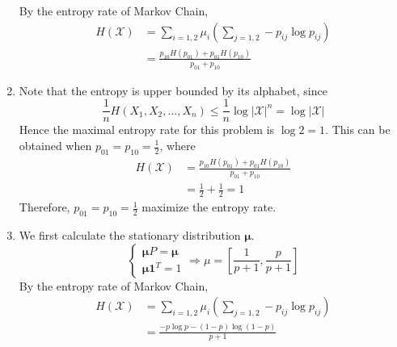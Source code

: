 \begin{exercise}
\begin{solution}
\begin{enumerate}
{\begin{equation}
      \end{equation}
      By the entropy rate of Markov Chain,
      \begin{equation}
        \begin{aligned}
          H(\mathcal{X}) &= \sum_{i=1,2} \mu_i \left(\sum_{j=1,2} - p_{ij} \log {p_{ij}}\right) \\
          &= \frac{p_{10}H(p_{01})+p_{01}H(p_{10})}{p_{01}+p_{10}}
        \end{aligned}
      \end{equation}
    }
    \item {
      Note that the entropy is upper bounded by its alphabet, since
      \begin{equation}
        \frac{1}{n} H\left(X_{1}, X_{2}, \ldots, X_{n}\right) \le \frac{1}{n} \log |\mathcal{X}|^n = \log |\mathcal{X}|
      \end{equation}
      Hence the maximal entropy rate for this problem is $\log 2 = 1$. This can be obtained when $p_{01} = p_{10} = \frac{1}{2}$, where
      \begin{equation}
        \begin{aligned}
          H(\mathcal{X}) &= \frac{p_{10}H(p_{01})+p_{01}H(p_{10})}{p_{01}+p_{10}} \\
          &= \frac{1}{2} + \frac{1}{2}  = 1
        \end{aligned}
      \end{equation}
      Therefore, $p_{01} = p_{10} = \frac{1}{2}$ maximize the entropy rate.
    }
    \item {
      We first calculate the stationary distribution $\mathbf{\mu}$.
      \begin{equation}
        \left\{\begin{array}{c}
          \mathbf{\mu}P = \mathbf{\mu} \\
          \mathbf{\mu} \mathbf{1}^T = 1
        \end{array}\right. \Rightarrow \mu = \left[\frac{1}{p+1}, \frac{p}{p+1}\right]
      \end{equation}
      By the entropy rate of Markov Chain,
      \begin{equation}
        \begin{aligned}
          H(\mathcal{X}) &= \sum_{i=1,2} \mu_i \left(\sum_{j=1,2} - p_{ij} \log {p_{ij}}\right) \\
          &= \frac{-p\log p -(1-p)\log (1-p)}{p+1}
        \end{aligned}
      \end{equation}
}
\end{enumerate}
\end{solution}
\end{exercise}
